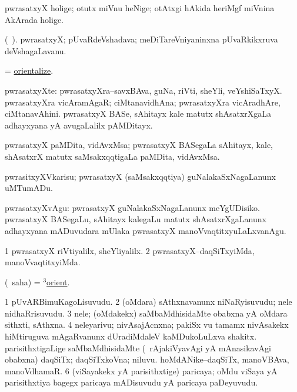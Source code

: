 \noindent
\gl{\pagu}
\bmng
{} pwrasatxyX holige; otutx miVnu heNige; otAtxgi hAkida heriMgf miVnina AkArada holige. 
\emng
\eentry

\bentry
{}
\gl{\nA}
\bmng
(\kanmu\ ). pwrasatxyX; pUvaRdeVshadava; meDiTareVniyaninxna pUvaRkikxruva deVshagaLavanu. 
\emng
\eentry

\bentry
{}
\gl{\kirx}
\bmng
= \hyperlink{orientalize}{orientalize}. 
\emng
\eentry

\bentry
{}
\gl{\nA}
\bmng
pwrasatxyXte: 
\banum
{} pwrasatxyXra--savxBAva, guNa, riVti, sheYli, veYshiSaTxyX. 
 pwrasatxyXra vicAramAgaR; ciMtanavidhAna; pwrasatxyXra vicAradhAre, ciMtanavAhini. 
 pwrasatxyX BASe, sAhitayx kale matutx shAsatxrXgaLa adhayxyana yA avugaLalilx pAMDitayx. 
\eanum
\emng
\eentry

\bentry
{}
\gl{\nA}
\bmng
pwrasatxyX paMDita, vidAvxMsa; pwrasatxyX BASegaLa sAhitayx, kale, shAsatxrX matutx saMsakxqqtigaLa paMDita, vidAvxMsa. 
\emng
\eentry

\bentry
{}
\gl{\sakirx}
\bmng
pwrasitxyXVkarisu; pwrasatxyX (saMsakxqqtiya) guNalakaSxNagaLanunx uMTumADu. 
\emng

\noindent
\gl{\akirx}
\bmng
pwrasatxyXvAgu: 
\banum
{} pwrasatxyX guNalakaSxNagaLanunx meYgUDisiko. 
 pwrasatxyX BASegaLu, sAhitayx kalegaLu matutx shAsatxrXgaLanunx adhayxyana mADuvudara mUlaka pwrasatxyX manoVvaqtitxyuLaLxvanAgu. 
\eanum
\emng
\eentry

\bentry
{}
\gl{\kirxvi}
\bmng
\bnum
\num{1} pwrasatxyX riVtiyalilx, sheYliyalilx. 
\num{2} pwrasatxyX--daqSiTxyiMda, manoVvaqtitxyiMda. 
\enum
\emng
\eentry

\bentry
{}
\gl{\sakirx}
\bmng
(\akirx\ saha) = \hyperlink{orient(3)}{$^3$orient}. 
\emng
\eentry

\bentry
{}
\gl{\nA}
\bmng
\bnum
\num{1} pUvARBimuKagoLisuvudu. 
\num{2} (oMdara) sAthxnavanunx niNaRyisuvudu; nele nidhaRrisuvudu. 
\num{3} nele; (oMdakekx) saMbaMdhisidaMte obabxna yA oMdara sithxti, sAthxna. 
\num{4} neleyarivu; nivAsajAcnxna; pakiSx \mo vu tamamx nivAsakekx hiMtiruguva mAgaRvanunx dUradiMdaleV kaMDukoLuLxva shakitx. 
 parisithxtigaLige saMbaMdhisidaMte (\kanmu\ rAjakiVyavAgi yA mAnasikavAgi obabxna) 
\banum
{} daqSiTx; daqSiTxkoVna; niluvu. 
 hoMdANike--daqSiTx, manoVBAva, manoVdhamaR. 
\eanum
\numie
\num{6} (viSayakekx yA parisithxtige) paricaya; oMdu viSaya yA parisithxtiya bagegx paricaya mADisuvudu yA paricaya paDeyuvudu. 
\enum
\emng
\eentry

